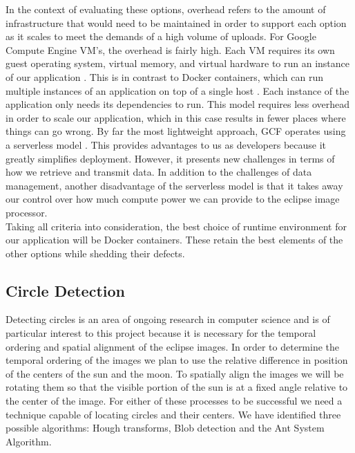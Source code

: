 \documentclass[10pt, onecolumn, draftclsnofoot, letterpaper, compsoc]{IEEEtran}
\begin{document}
In the context of evaluating these options, overhead refers to the amount of
infrastructure that would need to be maintained in order to support each option
as it scales to meet the demands of a high volume of uploads. For Google Compute
Engine VM’s, the overhead is fairly high. Each VM requires its own guest
operating system, virtual memory, and virtual hardware to run an instance of our
application \cite{docker, gcf}. This is in contrast to Docker containers, which
can run multiple instances of an application on top of a single host
\cite{docker}. Each instance of the application only needs its dependencies to
run. This model requires less overhead in order to scale our application, which
in this case results in fewer places where things can go wrong. By far the most
lightweight approach, GCF operates using a serverless model \cite{gcp}. This
provides advantages to us as developers because it greatly simplifies
deployment. However, it presents new challenges in terms of how we retrieve and
transmit data. In addition to the challenges of data management, another
disadvantage of the serverless model is that it takes away our control over how
much compute power we can provide to the eclipse image processor. \\


Taking all criteria into consideration, the best choice of runtime environment
for our application will be Docker containers. These retain the best elements of
the other options while shedding their defects.

\subsection{Circle Detection}

Detecting circles is an area of ongoing research in computer science and is of
particular interest to this project because it is necessary for the temporal
ordering and spatial alignment of the eclipse images. In order to determine the
temporal ordering of the images we plan to use the relative difference in
position of the centers of the sun and the moon. To spatially align the images
we will be rotating them so that the visible portion of the sun is at a fixed
angle relative to the center of the image. For either of these processes to be
successful we need a technique capable of locating circles and their centers. We
have identified three possible algorithms: Hough transforms, Blob detection and
the Ant System Algorithm. \\
\end{document}
